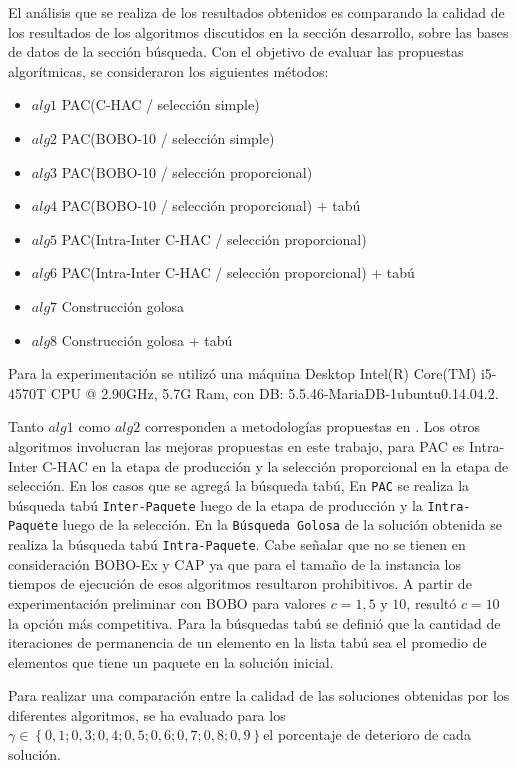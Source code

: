 El análisis que se realiza de los resultados obtenidos es comparando la calidad de los resultados de los algoritmos discutidos en la sección desarrollo, sobre las bases de datos de la sección búsqueda. Con el objetivo de evaluar las propuestas algorítmicas, se consideraron los siguientes métodos:

\begin{itemize}
\item{$alg1$} PAC(C-HAC / selección simple)
\item{$alg2$} PAC(BOBO-10 / selección simple)
\item{$alg3$} PAC(BOBO-10 / selección proporcional)
\item{$alg4$} PAC(BOBO-10 / selección proporcional) + tabú
\item{$alg5$} PAC(Intra-Inter C-HAC / selección proporcional)
\item{$alg6$} PAC(Intra-Inter C-HAC / selección proporcional) + tabú
\item{$alg7$} Construcción golosa
\item{$alg8$} Construcción golosa + tabú
\end{itemize}

Para la experimentación se utilizó una máquina Desktop Intel(R) Core(TM) i5-4570T CPU @ 2.90GHz, 5.7G Ram, con DB: 5.5.46-MariaDB-1ubuntu0.14.04.2.

Tanto $alg1$ como $alg2$ corresponden a metodologías propuestas en \cite{compositeRetrival}. Los otros algoritmos involucran las mejoras propuestas en este trabajo, para PAC es Intra-Inter C-HAC en la etapa de producción y la selección proporcional en la etapa de selección. En los casos que se agregá la búsqueda tabú, En \texttt{PAC} se realiza la búsqueda tabú \texttt{Inter-Paquete} luego de la etapa de producción y la \texttt{Intra-Paquete} luego de la selección. En la \texttt{Búsqueda Golosa} de la solución obtenida se realiza la búsqueda tabú \texttt{Intra-Paquete}. Cabe señalar que no se tienen en consideración BOBO-Ex y CAP ya que para el tamaño de la instancia los tiempos de ejecución de esos algoritmos resultaron prohibitivos. A partir de experimentación preliminar con BOBO para valores $c=1, 5$ y $10$, resultó $c=10$ la opción más competitiva.  Para la búsquedas tabú se definió que la cantidad de iteraciones de permanencia de un elemento en la lista tabú sea el promedio de elementos que tiene un paquete en la solución inicial.

Para realizar una comparación entre la calidad de las soluciones obtenidas por los diferentes algoritmos, se ha evaluado para los $\gamma \in \left\{0,1; 0,3; 0,4; 0,5; 0,6; 0,7; 0,8; 0,9\right\} $el porcentaje de deterioro de cada solución.

